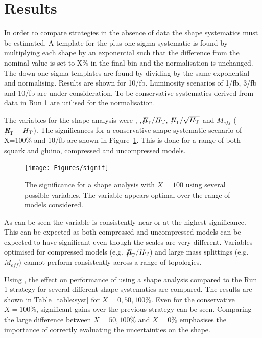 \section{Results}

In order to compare strategies in the absence of data the shape systematics must be estimated. A template for the plus one sigma systematic is found by multiplying each shape by an exponential such that 
the difference from the nominal value is set to X\% in the final bin 
and the normalisation is unchanged. The down one sigma templates are found by 
dividing by the same exponential and normalising. Results  are shown for 10/fb. Luminosity scenarios of 1/fb, 3/fb and 10/fb are under consideration.
To be conservative systematics derived from data in Run 1 are utilised for the normalisation.

The variables for the shape analysis were \alphat, \mht,$\mht/\scalht$, $\mht/\sqrt{\scalht}$ and 
$M_{eff}$ ($\mht+\scalht$). The significances for a conservative shape systematic scenario of X=100\% and 10/fb are shown in Figure~\ref{fig:signif}. This is done for a range of both squark and gluino, compressed and uncompressed models. 

\begin{figure}
\centering
    \texttt{[image: Figures/signif]}
  \caption{The significance for a shape analysis with $X = 100$ using several possible variables. The \mht variable appears optimal over the range of models considered.}
  \label{fig:signif}
\end{figure}

As can be seen the \mht variable is consistently near or at the highest 
significance. This can be expected as both compressed and uncompressed models can be expected 
to have significant \mht even though the \scalht scales are very different. Variables optimised
for compressed models (e.g. $\mht/\scalht$) and large mass splittings (e.g. $M_{eff}$) cannot perform consistently across a range of topologies.

Using \mht, the effect on performance of using a shape analysis compared to the
Run 1 strategy for several different shape systematics are compared. The results 
are shown in Table~\ref{table:syst} for $X = 0,50,100\%$. Even for the conservative
$X=100\%$, significant gains over the previous strategy can be seen. Comparing the large difference between
$X=50,100\%$ and $X=0\%$ emphasises the importance of correctly evaluating the uncertainties on the shape.

